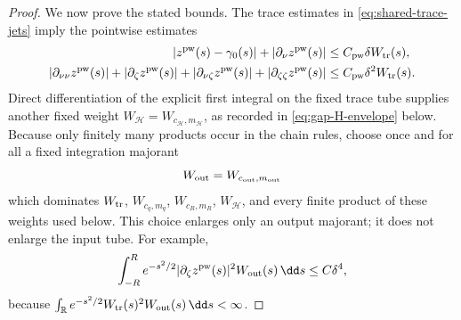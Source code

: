 \begin{proof}
We now prove the stated bounds.  The trace estimates in
\cref{eq:shared-trace-jets} imply the pointwise estimates
\begin{align}
 |z^{\rm pw}(s)-\gamma_0(s)|
       +|\partial_\nu z^{\rm pw}(s)|
 &\le C_{\rm pw}\delta W_{\rm tr}(s),\notag\\
 |\partial_{\nu\nu}z^{\rm pw}(s)|
       +|\partial_\zeta z^{\rm pw}(s)|
       +|\partial_{\nu\zeta}z^{\rm pw}(s)|
       +|\partial_{\zeta\zeta}z^{\rm pw}(s)|
 &\le C_{\rm pw}\delta^2 W_{\rm tr}(s).              \label{eq:gap-pointwise-trace-jets}
\end{align}
Direct differentiation of the explicit first integral on the fixed trace
tube supplies another fixed weight
\(W_{\mathscr H}=W_{c_{\mathscr H},m_{\mathscr H}}\), as recorded in
\cref{eq:gap-H-envelope} below.  Because only finitely many products occur
in the chain rules, choose once and for all a fixed integration majorant
\[
 W_{\rm out}=W_{c_{\rm out},m_{\rm out}}
\]
which dominates \(W_{\rm tr}\), \(W_{c_q,m_q}\),
\(W_{c_R,m_R}\), \(W_{\mathscr H}\), and every finite product of these
weights used below.  This choice enlarges only an output majorant; it does
not enlarge the input tube.
For example,
\begin{equation}
 \int_{-R}^{R}e^{-s^2/2}
       |\partial_\zeta z^{\rm pw}(s)|^2
       W_{\rm out}(s)\,\dd s\le C\delta^4,           \label{eq:gap-quadratic-trace}
\end{equation}
because
\(\int_{\mathbb R}e^{-s^2/2}W_{\rm tr}(s)^2
W_{\rm out}(s)\,\dd s<\infty\).


\end{proof}
